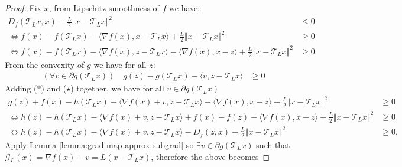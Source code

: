 \documentclass[12pt]{article}
\begin{document}
    \begin{proof}
        Fix $x$, 
        from Lipschitz smoothness of $f$ we have: 
        \begin{align*}
            D_f(\mathcal T_Lx, x) - \frac{L}{2}\Vert x - \mathcal T_L x\Vert^2
            &\le 0
            \\
            \iff 
            f(x) - f(\mathcal T_L x) - \langle \nabla f(x), x - \mathcal T_L x\rangle + 
            \frac{L}{2}\Vert x-  \mathcal T_L x\Vert^2 
            &\ge 0
            \\
            \iff 
            f(x) - f(\mathcal T_L x)
            - \langle \nabla f(x), z - \mathcal T_L x\rangle
            - \langle \nabla f(x), x - z\rangle
            + 
            \frac{L}{2}\Vert x-  \mathcal T_L x\Vert^2 
            &\ge 0
            \tag{$*$}
        \end{align*}
        From the convexity of $g$ we have for all $z$: 
        \begin{align*}
            (\forall v \in \partial g(\mathcal T_L x))
            \quad 
            g(z) - g(\mathcal T_L x) 
            - \langle  v, z - \mathcal T_L x\rangle
            &\ge 0
            \tag{$\star$}
        \end{align*}
        Adding ($*$) and ($\star$) together, we have for all $v \in \partial g(\mathcal T_L x)$
        {\small
        \begin{align*}
            g(z) + f(x) - h(\mathcal T_Lx)
            - \langle \nabla f(x) + v, z - \mathcal T_L x\rangle
            - \langle \nabla f(x), x - z\rangle
            + \frac{L}{2}\Vert x - \mathcal T_L x\Vert^2 &\ge 0
            \\
            \iff 
            h(z) - h(\mathcal T_L x)
            - \langle \nabla f(x) + v, z - \mathcal T_L x\rangle
            + f(x) - f(z) 
            - \langle \nabla f(x), x - z\rangle
            + \frac{L}{2}\Vert x - \mathcal T_L x\Vert^2
            &\ge 0
            \\
            \iff 
            h(z) - h(\mathcal T_L x)
            - \langle \nabla f(x) + v, z - \mathcal T_L x\rangle
            - D_f(z, x)
            + \frac{L}{2}\Vert x - \mathcal T_L x\Vert^2
            &\ge 0. 
        \end{align*}
        }
        Apply 
        \hyperref[lemma:grad-map-approx-subgrad]{Lemma \ref*{lemma:grad-map-approx-subgrad}} 
        so $\exists v \in \partial g(\mathcal T_L x)$ such that $\mathcal G_L(x) = \nabla f(x) + v = L (x - \mathcal T_L x)$, therefore the above becomes

\end{proof}
\end{document}
